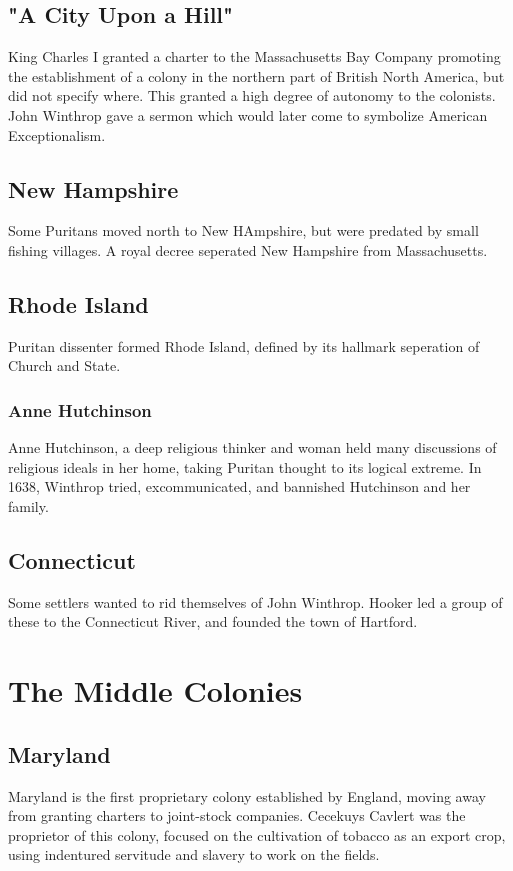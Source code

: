 \subsection{"A City Upon a Hill"}
King Charles I granted a charter to the Massachusetts Bay Company promoting the
establishment of a colony in the northern part of British North America, but did
not specify where.  This granted a high degree of autonomy to the colonists.
John Winthrop gave a sermon which would later come to symbolize American
Exceptionalism.

\subsection{New Hampshire}
Some Puritans moved north to New HAmpshire, but were predated by small fishing
villages.  A royal decree seperated New Hampshire from Massachusetts.

\subsection{Rhode Island}
Puritan dissenter formed Rhode Island, defined by its hallmark seperation of
Church and State.

\subsubsection{Anne Hutchinson}
Anne Hutchinson, a deep religious thinker and woman held many discussions of
religious ideals in her home, taking Puritan thought to its logical extreme.  In
1638, Winthrop tried, excommunicated, and bannished Hutchinson and her family.

\subsection{Connecticut}
Some settlers wanted to rid themselves of John Winthrop.  Hooker led a group of
these to the Connecticut River, and founded the town of Hartford.

\section{The Middle Colonies}
\subsection{Maryland}
Maryland is the first proprietary colony established by England, moving away
from granting charters to joint-stock companies.  Cecekuys Cavlert was the
proprietor of this colony, focused on the cultivation of tobacco as an export
crop, using indentured servitude and slavery to work on the fields.

